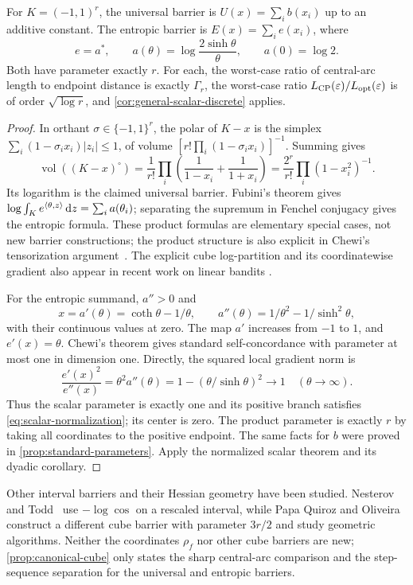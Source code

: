 \begin{proposition}
\label{prop:canonical-cube}
For $K=(-1,1)^r$, the universal barrier is $U(x)=\sum_i b(x_i)$
up to an additive constant. The entropic barrier is
$E(x)=\sum_i e(x_i)$, where
\[
 e=a^*,\qquad a(\theta)=\log\frac{2\sinh\theta}{\theta},
 \qquad a(0)=\log2.
\]
Both have parameter exactly $r$. For each, the worst-case
ratio of central-arc length to endpoint distance is exactly $\Gamma_r$,
the worst-case ratio $L_{\mathrm{CP}}(\varepsilon)/L_{\mathrm{opt}}(\varepsilon)$ is of order
$\sqrt{\log r}$, and \cref{cor:general-scalar-discrete} applies.
\end{proposition}
\begin{proof}
In orthant $\sigma\in\{-1,1\}^r$, the polar of $K-x$ is the
simplex $\sum_i(1-\sigma_ix_i)|z_i|\leq1$, of volume
$[r!\prod_i(1-\sigma_ix_i)]^{-1}$. Summing gives
\[
 \operatorname{vol}((K-x)^\circ)
 =\frac1{r!}\prod_i\left(\frac1{1-x_i}+\frac1{1+x_i}\right)
 =\frac{2^r}{r!}\prod_i(1-x_i^2)^{-1}.
\]
Its logarithm is the claimed universal barrier. Fubini's theorem gives
$\log\int_K e^{\langle \theta,z\rangle}\,\mathrm d z=\sum_i a(\theta_i)$;
separating the supremum in Fenchel conjugacy gives the entropic formula.
These product formulas are elementary special cases, not new barrier
constructions; the product structure is also explicit in
Chewi's tensorization argument~\cite[Section 4]{Chewi2023}.
The explicit cube log-partition and its coordinatewise gradient also
appear in recent work on linear bandits
\cite[Section 6.1]{LevyValeauAkhavanRebeschini2026}.

For the entropic summand, $a''>0$ and
\[
 x=a'(\theta)=\coth\theta-1/\theta,
 \qquad a''(\theta)=1/\theta^2-1/\sinh^2\theta,
\]
with their continuous values at zero. The map $a'$ increases from
$-1$ to $1$, and $e'(x)=\theta$. Chewi's theorem gives standard
self-concordance with parameter at most one in dimension one.
Directly, the squared local gradient norm is
\[
 \frac{e'(x)^2}{e''(x)}=\theta^2a''(\theta)
 =1-(\theta/\sinh\theta)^2\longrightarrow1
 \quad(\theta\to\infty).
\]
Thus the scalar parameter is exactly one and its positive branch
satisfies \eqref{eq:scalar-normalization}; its center is zero.
The product parameter is exactly $r$ by taking all coordinates to
the positive endpoint. The same facts for $b$ were proved in
\cref{prop:standard-parameters}. Apply the normalized scalar theorem
and its dyadic corollary.
\end{proof}

Other interval barriers and their Hessian geometry have been studied. Nesterov and Todd~\cite[Section 6.2]{NesterovTodd2002}
use $-\log\cos$ on a rescaled interval, while Papa Quiroz and
Oliveira~\cite{PapaQuirozOliveira2007} construct a different cube
barrier with parameter $3r/2$ and study geometric algorithms.
Neither the coordinates $\rho_f$ nor other cube barriers are new;
\cref{prop:canonical-cube} only states the sharp central-arc
comparison and the step-sequence separation for the universal and
entropic barriers.

